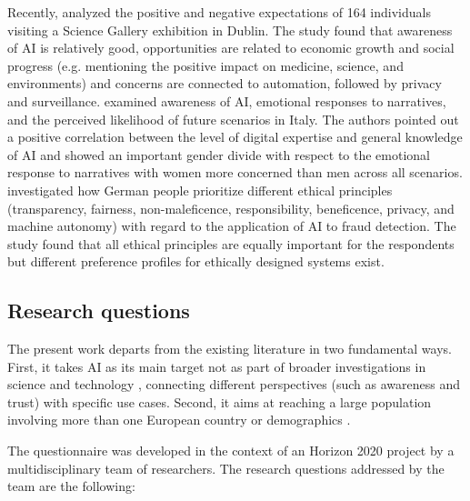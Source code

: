 \documentclass{article}
\begin{document}
Recently, \cite{kerr2020expectations} analyzed the positive and negative expectations of 164 individuals visiting a Science Gallery exhibition in Dublin. The study found that awareness of AI is relatively good, opportunities are related to economic growth and social progress (e.g. mentioning the positive impact on medicine, science, and environments) and concerns are connected to automation, followed by privacy and surveillance. \cite{sartori2022} examined awareness of AI, emotional responses to narratives, and the perceived likelihood of future scenarios in Italy. The authors pointed out a positive correlation between the level of digital expertise and general knowledge of AI and showed an important gender divide with respect to the emotional response to narratives with women more concerned than men across all scenarios. \cite{kieslich2022artificial} investigated how German people prioritize different ethical principles (transparency, fairness, non-maleficence, responsibility, beneficence, privacy, and machine autonomy) with regard to the application of AI to fraud detection. The study found that all ethical principles are equally important for the respondents but different preference profiles for ethically designed systems exist. 


\subsection{Research questions}

The present work departs from the existing literature in two fundamental ways. First, it takes AI as its main target not as part of broader investigations in science and technology \cite{european2021special}, connecting different perspectives (such as awareness and trust) with specific use cases. Second, it aims at reaching a large population involving more than one European country or demographics \cite{kieslich2022artificial, sartori2022, kerr2020expectations}. 

The questionnaire was developed in the context of %
an Horizon 2020 project by a multidisciplinary team of researchers. The research questions addressed by the team are the following:
\end{document}
